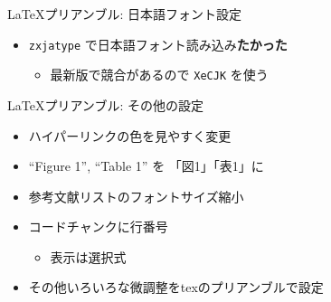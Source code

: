 \documentclass[
  12pt,
  ignorenonframetext,
]{beamer}
\providecommand{\tightlist}{%
  \setlength{\itemsep}{0pt}\setlength{\parskip}{0pt}}
\begin{document}
\begin{frame}[fragile]{\LaTeX プリアンブル: 日本語フォント設定}
\protect\hypertarget{ux30d7ux30eaux30a2ux30f3ux30d6ux30eb-ux65e5ux672cux8a9eux30d5ux30a9ux30f3ux30c8ux8a2dux5b9a}{}

\begin{itemize}
\tightlist
\item
  \texttt{zxjatype} で日本語フォント読み込み\textbf{たかった}

  \begin{itemize}
  \tightlist
  \item
    最新版で競合があるので \texttt{XeCJK} を使う
  \end{itemize}
\end{itemize}

\end{frame}

\begin{frame}{\LaTeX プリアンブル: その他の設定}
\protect\hypertarget{ux30d7ux30eaux30a2ux30f3ux30d6ux30eb-ux305dux306eux4ed6ux306eux8a2dux5b9a}{}

\begin{itemize}
\tightlist
\item
  ハイパーリンクの色を見やすく変更
\item
  ``Figure 1'', ``Table 1'' を 「図1」「表1」に
\item
  参考文献リストのフォントサイズ縮小
\item
  コードチャンクに行番号

  \begin{itemize}
  \tightlist
  \item
    表示は選択式
  \end{itemize}
\item
  その他いろいろな微調整をtexのプリアンブルで設定
\end{itemize}

\end{frame}
\end{document}
